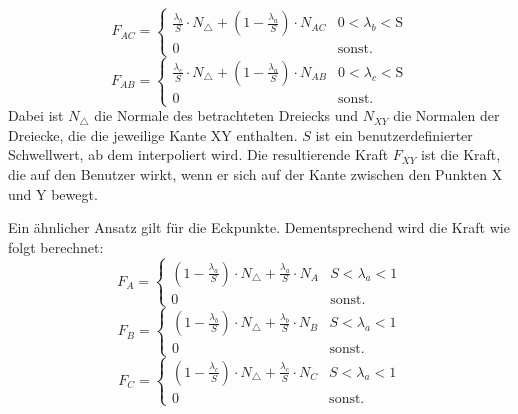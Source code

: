 \documentclass[conference]{IEEEtran}
\begin{document}
\begin{equation}
    F_{AC} = 
    \begin{cases} 
        \frac{\lambda_b}{S}\cdot N_{\triangle} + (1-\frac{\lambda_a}{S})\cdot N_{AC} &  0 < \lambda_b < \text{S} \\
        0 & \text{sonst.}
    \end{cases}
\end{equation}
\begin{equation*}
    F_{AB} = 
    \begin{cases} 
        \frac{\lambda_c}{S}\cdot N_{\triangle} + (1-\frac{\lambda_a}{S})\cdot N_{AB} &  0 < \lambda_c < \text{S} \\
        0 & \text{sonst.}
    \end{cases}
\end{equation*}
Dabei ist $N_{\triangle}$ die Normale des betrachteten Dreiecks und $N_{XY}$ die Normalen der Dreiecke, die die jeweilige Kante XY enthalten. $S$ ist ein benutzerdefinierter Schwellwert, ab dem interpoliert wird. Die resultierende Kraft $F_{XY}$ ist die Kraft, die auf den Benutzer wirkt, wenn er sich auf der Kante zwischen den Punkten X und Y bewegt.

Ein ähnlicher Ansatz gilt für die Eckpunkte. Dementsprechend wird die Kraft wie folgt berechnet:
\begin{equation*}
    F_{A} = 
    \begin{cases} 
        (1-\frac{\lambda_a}{S})\cdot N_{\triangle} + \frac{\lambda_a}{S}\cdot N_{A} &  S < \lambda_a < 1 \\
        0 & \text{sonst.}
    \end{cases}
\end{equation*} 
\begin{equation}
    F_{B} = 
    \begin{cases} 
        (1-\frac{\lambda_b}{S})\cdot N_{\triangle} + \frac{\lambda_b}{S}\cdot N_{B} &  S < \lambda_a < 1 \\
        0 & \text{sonst.}
    \end{cases}
\end{equation} 
\begin{equation*}
    F_{C} = 
    \begin{cases} 
        (1-\frac{\lambda_c}{S})\cdot N_{\triangle} + \frac{\lambda_c}{S}\cdot N_{C} &  S < \lambda_a < 1 \\
        0 & \text{sonst.}
    \end{cases}
\end{equation*} 
\end{document}
